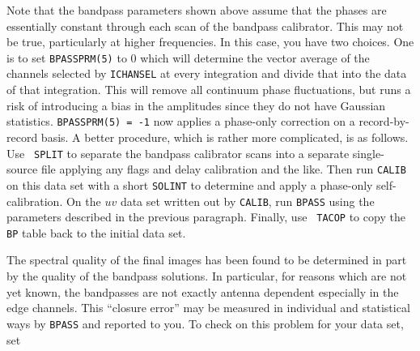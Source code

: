 Note that the bandpass parameters shown above assume that the phases
are essentially constant through each scan of the bandpass calibrator.
This may not be true, particularly at higher frequencies.  In this
case, you have two choices.  One is to set {\tt BPASSPRM(5)} to 0
which will determine the vector average of the channels selected by
{\tt ICHANSEL} at every integration and divide that into the data of
that integration.  This will remove all continuum phase fluctuations,
but runs a risk of introducing a bias in the amplitudes since they do
not have Gaussian statistics.  {\tt BPASSPRM(5) = -1} now applies a
phase-only correction on a record-by-record basis.  A better
procedure, which is rather more complicated, is as follows.  Use {\tt
SPLIT} to separate the bandpass calibrator scans into a separate
single-source file applying any flags and delay calibration and the
like.  Then run {\tt CALIB} on this data set with a short {\tt SOLINT}
to determine and apply a phase-only self-calibration.  On the $uv$
data set written out by {\tt CALIB}, run {\tt BPASS} using the
parameters described in the previous paragraph.  Finally, use {\tt
TACOP} to copy the {\tt BP} table back to the initial data set.

     The spectral quality of the final images has been found to be
determined in part by the quality of the bandpass solutions.  In
particular, for reasons which are not yet known, the bandpasses are
not exactly antenna dependent especially in the edge channels.  This
``closure error'' may be measured in individual and statistical ways
by {\tt BPASS} and reported to you.  To check on this problem for your
data set, set

